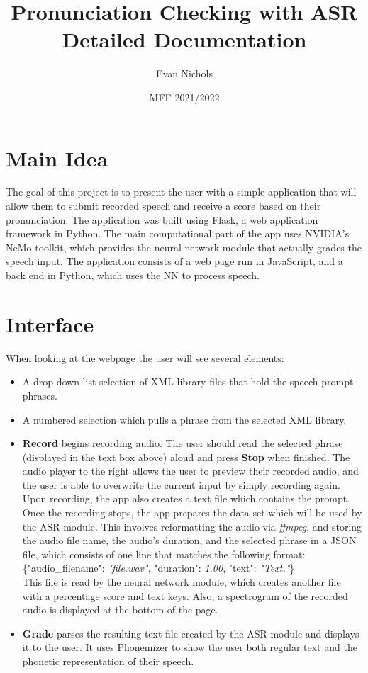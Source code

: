 \documentclass[12pt, letterpaper]{article}
\title{Pronunciation Checking with ASR\\ \small Detailed Documentation}
\author{Evan Nichols}
\date{MFF 2021/2022}
\begin{document}
\maketitle

\section*{Main Idea} \label{introduction}
The goal of this project is to present the user with a simple application that will allow them to submit recorded speech and receive a score based on their pronunciation. The application was built using Flask, a web application framework in Python. The main computational part of the app uses NVIDIA's NeMo toolkit, which provides the neural network module that actually grades the speech input. The application consists of a web page run in JavaScript, and a back end in Python, which uses the NN to process speech. 

\section*{Interface} \label{UI}
When looking at the webpage the user will see several elements:
\begin{itemize}
\item A drop-down list selection of XML library files that hold the speech prompt phrases.

\item A numbered selection which pulls a phrase from the selected XML library.

\item \textbf{Record} begins recording audio. The user should read the selected phrase (displayed in the text box above) aloud and press \textbf{Stop} when finished. The audio player to the right allows the user to preview their recorded audio, and the user is able to overwrite the current input by simply recording again. Upon recording, the app also creates a text file which contains the prompt. Once the recording stops, the app prepares the data set which will be used by the ASR module. This involves reformatting the audio via \textit{ffmpeg}, and storing the audio file name, the audio's duration, and the selected phrase in a JSON file, which consists of one line that matches the following format: \\
\hspace*{19mm} \{"audio\_filename": \textit{"file.wav"}, "duration": \textit{1.00}, "text": \textit{"Text."}\} \\
This file is read by the neural network module, which creates another file with a percentage score and text keys. Also, a spectrogram of the recorded audio is displayed at the bottom of the page.

\item \textbf{Grade} parses the resulting text file created by the ASR module and displays it to the user. It uses Phonemizer to show the user both regular text and the phonetic representation of their speech.
\end{itemize}
\newpage%
\end{document}
